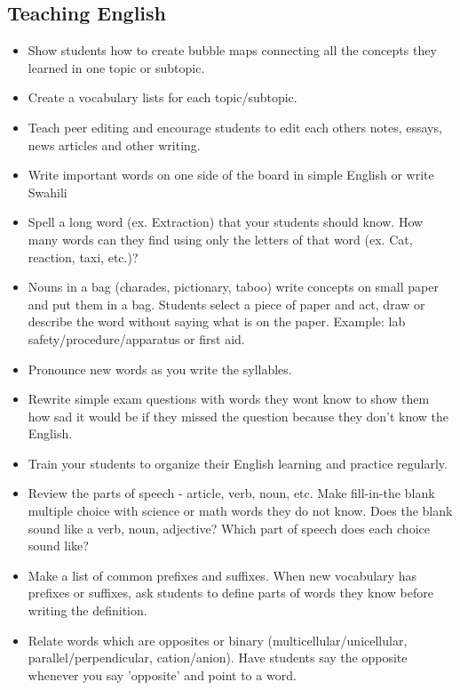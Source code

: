 \subsection{Teaching English}
\begin{itemize}
\item Show students how to create bubble maps connecting all the concepts
they learned in one topic or subtopic. 
\item Create a vocabulary lists for each topic/subtopic.  
\item Teach peer editing and encourage students to edit each others notes,
essays, news articles and other writing. 
\item Write important words on one side of the board in simple English or
write Swahili  
\item Spell a long word (ex. Extraction) that your students should know.
How many words can they find using only the letters of that word (ex.
Cat, reaction, taxi, etc.)? 
\item Nouns in a bag (charades, pictionary, taboo) write concepts on small
paper and put them in a bag. Students select a piece of paper and
act, draw or describe the word without saying what is on the paper.
Example: lab safety/procedure/apparatus or first aid. 
\item Pronounce new words as you write the syllables. 
\item Rewrite simple exam questions with words they wont know to show them
how sad it would be if they missed the question because they don't
know the English. 
\item Train your students to organize their English learning and practice
regularly.  
\item Review the parts of speech - article, verb, noun, etc. Make fill-in-the
blank multiple choice with science or math words they do not know.
Does the blank sound like a verb, noun, adjective? Which part of speech
does each choice sound like?  
\item Make a list of common prefixes and suffixes. When new vocabulary has
prefixes or suffixes, ask students to define parts of words they know
before writing the definition.  
\item Relate words which are opposites or binary (multicellular/unicellular,
parallel/perpendicular, cation/anion). Have students say the opposite
whenever you say 'opposite' and point to a word. 
\end{itemize}

